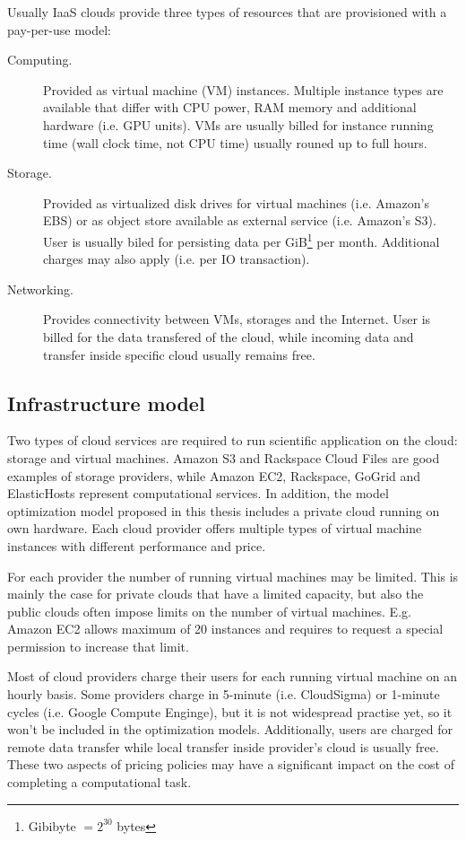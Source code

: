 Usually IaaS clouds provide three types of resources that are provisioned with a pay-per-use model: 
\begin{description}
  \item[Computing.] Provided as virtual machine (VM) instances. Multiple instance types are available that differ with CPU power, RAM memory and additional hardware (i.e. GPU units). VMs are usually billed for instance running time (wall clock time, not CPU time) usually rouned up to full hours.
  \item[Storage.] Provided as virtualized disk drives for virtual machines (i.e. Amazon's EBS) or as object store available as external service (i.e. Amazon's S3). User is usually biled for persisting data per GiB\footnote{Gibibyte $= 2^{30}$ bytes} per month. Additional charges may also apply (i.e. per IO transaction).
  \item[Networking.] Provides connectivity between VMs, storages and the Internet. User is billed for the data transfered of the cloud, while incoming data and transfer inside specific cloud usually remains free.
\end{description}

\subsection{Infrastructure model}
\label{sec:intro:cloud:model}

Two types of cloud services are required to run scientific application on the cloud: storage and virtual machines. Amazon S3 and Rackspace Cloud Files are good examples of storage providers, while Amazon EC2, Rackspace, GoGrid and ElasticHosts represent computational services. In addition, the model optimization model proposed in this thesis includes a private cloud running on own hardware. Each cloud provider offers multiple types of virtual machine instances with different performance and price.

For each provider the number of running virtual machines may be limited. This is mainly the case for private clouds that have a limited capacity, but also the public clouds often impose limits on the number of virtual machines. E.g. Amazon EC2 allows maximum of 20 instances and requires to request a special permission to increase that limit. 

Most of cloud providers charge their users for each running virtual machine on an hourly basis. Some providers charge in 5-minute (i.e. CloudSigma) or 1-minute cycles (i.e. Google Compute Enginge), but it is not widespread practise yet, so it won't be included in the optimization models. Additionally, users are charged for remote data transfer while local transfer inside provider's cloud is usually free. These two aspects of pricing policies may have a significant impact on the cost of completing a computational task.

